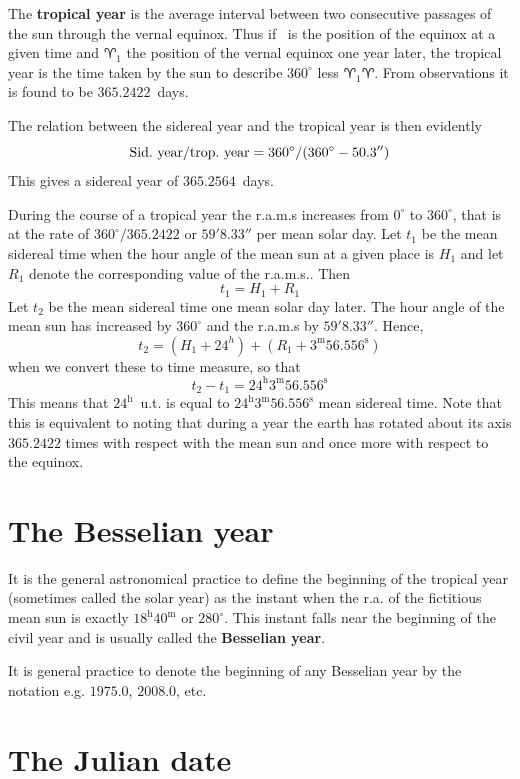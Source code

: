 The {\bf tropical year} is the average interval between two consecutive 
passages of the sun through the vernal equinox. Thus if \aries\ is the 
position of the equinox
at a given time and $\aries_1$ the position of the vernal equinox one year later, the 
tropical year is the time taken by the sun to describe $360^\circ$ less 
$\aries_1\aries$. From observations it is found to be $365.2422$~days. 

The relation between the sidereal year and the tropical year is then evidently
\[ 
{{\rm Sid.~year}/{\rm trop.~year}}={360^\circ/{(360^\circ-50.3'')}}
\]
This gives a sidereal year of $365.2564$~days.

During the course of a tropical year the {\sc r.a.m.s} increases from $0^\circ$ to
$360^\circ$, that is at the rate of $360^\circ/365.2422$ or $59'8.33''$ per mean 
solar day. Let $t_1$ be the mean sidereal time when the hour angle of the mean sun
at a given place is $H_1$ and let $R_1$ denote the corresponding value of 
the {\sc r.a.m.s.}. Then
\[
t_1=H_1+R_1
\]
Let $t_2$ be the mean sidereal time one mean solar day later. The hour angle of 
the mean sun has increased by $360^\circ$ and the {\sc r.a.m.s} by $59'8.33''$.
Hence,
\[
	t_2=(H_1+24^h)+(R_1+3^{\mathrm{m}}56.556^{\mathrm{s}})
\]
when we convert these to time measure, so that 
\[
	t_2-t_1=24^{\mathrm{h}}3^{\mathrm{m}}56.556^{\mathrm{s}}
\]
This means that $24^{\mathrm{h}}$~{\sc u.t.} is equal to
$24^{\mathrm{h}}3^{\mathrm{m}}56.556^{\mathrm{s}}$ mean sidereal time.
Note that this is equivalent to noting that during a year the earth has rotated about
its axis $365.2422$ times with respect with the mean sun and once more with respect
to the equinox.

\section{The Besselian year}

It is the general astronomical practice to define the beginning of the tropical year
(sometimes called the solar year) as the instant when the {\sc r.a.} of the fictitious
mean sun is exactly $18^{\mathrm{h}}40^{\mathrm{m}}$ or $280^\circ$. This instant falls near the beginning of
the civil year and is usually called the {\bf Besselian year}. 

It is general practice to denote the beginning of any Besselian year by the notation
e.g. $1975.0$, $2008.0$, etc.

\section{The Julian date}

